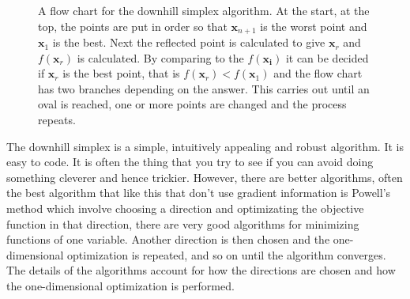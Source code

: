 \documentclass[11pt,a4paper]{scrartcl}
\begin{document}
\begin{figure}
\begin{center}
\end{center}
\caption{A flow chart for the downhill simplex algorithm. At the
  start, at the top, the points are put in order so that
  $\mathbf{x}_{n+1}$ is the worst point and $\mathbf{x}_1$ is the
  best. Next the reflected point is calculated to give $\mathbf{x}_r$
  and $f(\mathbf{x}_r)$ is calculated. By comparing to the
  $f(\mathbf{x_i})$ it can be decided if $\mathbf{x}_r$ is the best
  point, that is $f(\mathbf{x}_r)<f(\mathbf{x}_1)$ and the flow chart
  has two branches depending on the answer. This carries out until an
  oval is reached, one or more points are changed and the process
  repeats.\label{fig:flowchart}}
\end{figure}

The downhill simplex is a simple, intuitively appealing and robust
algorithm. It is easy to code. It is often the thing that you try to
see if you can avoid doing something cleverer and hence
trickier. However, there are better algorithms, often the best
algorithm that like this that don't use gradient information is
Powell's method which involve choosing a direction and optimizating
the objective function in that direction, there are very good
algorithms for minimizing functions of one variable. Another direction
is then chosen and the one-dimensional optimization is repeated, and
so on until the algorithm converges. The details of the algorithms
account for how the directions are chosen and how the one-dimensional
optimization is performed.
\end{document}
